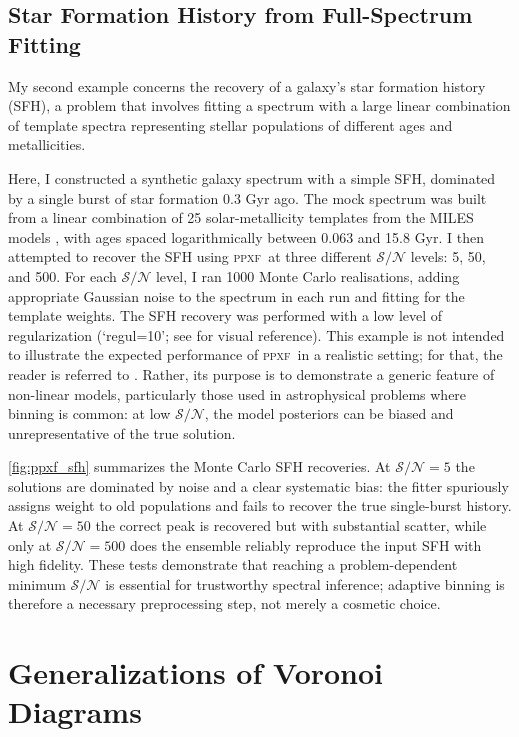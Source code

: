 \documentclass[fleqn,usenatbib]{mnras}
\newcommand{\ppxf}{\textsc{ppxf}}
\newcommand{\sn}{\mathcal{S/N}}
\begin{document}
\subsection{Star Formation History from Full-Spectrum Fitting} 

My second example concerns the recovery of a galaxy's star formation history (SFH), a problem that involves fitting a spectrum with a large linear combination of template spectra representing stellar populations of different ages and metallicities.
       
Here, I constructed a synthetic galaxy spectrum with a simple SFH, dominated by a single burst of star formation 0.3 Gyr ago. The mock spectrum was built from a linear combination of 25 solar-metallicity templates from the MILES models \citep{Vazdekis2010}, with ages spaced logarithmically between 0.063 and 15.8 Gyr. I then attempted to recover the SFH using \ppxf\ at three different $\sn$ levels: 5, 50, and 500. For each $\sn$ level, I ran 1000 Monte Carlo realisations, adding appropriate Gaussian noise to the spectrum in each run and fitting for the template weights. 
The SFH recovery was performed with a low level of regularization (`regul=10'; see \citealt[fig.~5]{Cappellari2023} for visual reference). This example is not intended to illustrate the expected performance of \ppxf\ in a realistic setting; for that, the reader is referred to \citet{Woo2024}. Rather, its purpose is to demonstrate a generic feature of non-linear models, particularly those used in astrophysical problems where binning is common: at low $\sn$, the model posteriors can be biased and unrepresentative of the true solution.

\autoref{fig:ppxf_sfh} summarizes the Monte Carlo SFH recoveries. At $\sn=5$ the solutions are dominated by noise and a clear systematic bias: the fitter spuriously assigns weight to old populations and fails to recover the true single-burst history. At $\sn=50$ the correct peak is recovered but with substantial scatter, while only at $\sn=500$ does the ensemble reliably reproduce the input SFH with high fidelity. These tests demonstrate that reaching a problem-dependent minimum $\sn$ is essential for trustworthy spectral inference; adaptive binning is therefore a necessary preprocessing step, not merely a cosmetic choice.


\section{Generalizations of Voronoi Diagrams}
\label{sec:voronoi_generalizations}
\end{document}
